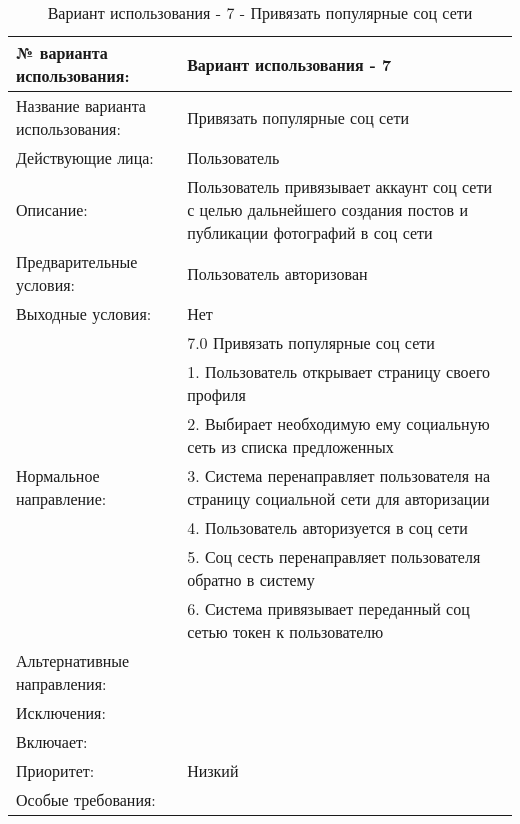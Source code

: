 \begin{table}[H]
  \caption{\onehalfspacing Вариант использования - 7 - Привязать популярные соц сети}\label{use-case-7-table}
  \begin{tabular}{|p{6cm}|p{10cm}|}
  \hline № варианта использования: & Вариант использования - 7 \\
  \hline Название варианта использования: & Привязать популярные соц сети \\
  \hline Действующие лица: & Пользователь \\
  \hline Описание: & Пользователь привязывает аккаунт соц сети с целью дальнейшего создания постов и публикации фотографий в соц сети \\
  \hline Предварительные условия: & Пользователь авторизован \\
  \hline Выходные условия: & Нет \\
  \hline \multirow{7}{*}{Нормальное направление:} & 7.0 Привязать популярные соц сети \\
  \cline{2-2} & 1. Пользователь открывает страницу своего профиля \\
  \cline{2-2} & 2. Выбирает необходимую ему социальную сеть из списка предложенных \\
  \cline{2-2} & 3. Система перенаправляет пользователя на страницу социальной сети для авторизации  \\
  \cline{2-2} & 4. Пользователь авторизуется в соц сети \\
  \cline{2-2} & 5. Соц сесть перенаправляет пользователя обратно в систему \\
  \cline{2-2} & 6. Система привязывает переданный соц сетью токен к пользователю \\
  \hline Альтернативные направления: &  \\
  \hline Исключения: &  \\
  \hline Включает: &  \\
  \hline Приоритет: & Низкий \\
  \hline Особые требования: &  \\
  \hline 
  \end{tabular}
\end{table}

